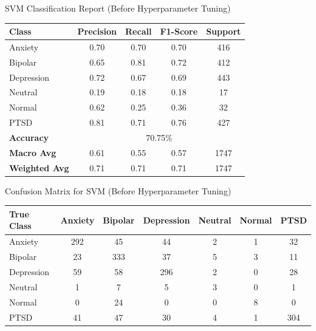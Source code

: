 \begin{center}
    \caption{SVM Classification Report (Before Hyperparameter Tuning)}
\begin{tabular}{|l|c|c|c|c|}
\hline
\textbf{Class} & \textbf{Precision} & \textbf{Recall} & \textbf{F1-Score} & \textbf{Support} \\ \hline
Anxiety        & 0.70               & 0.70            & 0.70              & 416              \\ \hline
Bipolar        & 0.65               & 0.81            & 0.72              & 412              \\ \hline
Depression     & 0.72               & 0.67            & 0.69              & 443              \\ \hline
Neutral        & 0.19               & 0.18            & 0.18              & 17               \\ \hline
Normal         & 0.62               & 0.25            & 0.36              & 32               \\ \hline
PTSD           & 0.81               & 0.71            & 0.76              & 427              \\ \hline
\textbf{Accuracy} & \multicolumn{4}{|c|}{70.75\%} \\ \hline
\textbf{Macro Avg} & 0.61            & 0.55            & 0.57              & 1747             \\ \hline
\textbf{Weighted Avg} & 0.71         & 0.71            & 0.71              & 1747             \\ \hline
\end{tabular}

\vspace{0.25in}

\caption{Confusion Matrix for SVM (Before Hyperparameter Tuning)}
\begin{tabular}{|l|c|c|c|c|c|c|}
\hline
\textbf{True Class} & \textbf{Anxiety} & \textbf{Bipolar} & \textbf{Depression} & \textbf{Neutral} & \textbf{Normal} & \textbf{PTSD} \\ \hline
Anxiety             & 292              & 45               & 44                  & 2                & 1               & 32            \\ \hline
Bipolar             & 23               & 333              & 37                  & 5                & 3               & 11            \\ \hline
Depression          & 59               & 58               & 296                 & 2                & 0               & 28            \\ \hline
Neutral             & 1                & 7                & 5                   & 3                & 0               & 1             \\ \hline
Normal              & 0                & 24               & 0                   & 0                & 8               & 0             \\ \hline
PTSD                & 41               & 47               & 30                  & 4                & 1               & 304           \\ \hline
\end{tabular}


\end{center}
